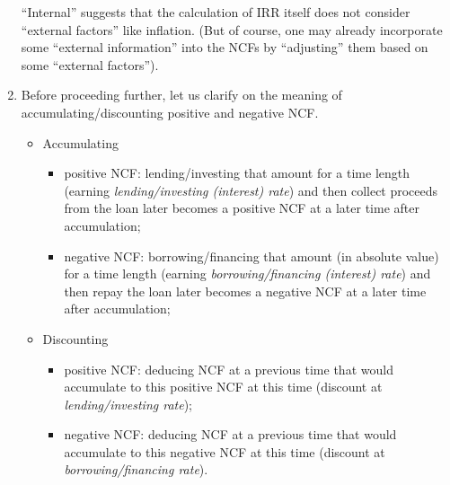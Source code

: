 \begin{enumerate}
\begin{note}
``Internal'' suggests that the calculation of IRR itself does not consider
``external factors'' like inflation. (But of course, one may already
incorporate some ``external information'' into the NCFs by ``adjusting'' them
based on some ``external factors'').
\end{note}
\item \label{it:acc-disc-ncf-meaning}
Before proceeding further, let us clarify on the meaning of
accumulating/discounting positive and negative NCF.
\begin{itemize}
\item Accumulating
\begin{itemize}
\item positive NCF: lending/investing that amount for a time length (earning
\emph{lending/investing (interest) rate}) and then collect proceeds from the
loan later  becomes a positive NCF at a later time after
accumulation;
\item negative NCF: borrowing/financing that amount (in absolute value) for a
time length (earning \emph{borrowing/financing (interest) rate}) and then repay
the loan later  becomes a negative NCF at a later time
after accumulation;
\end{itemize}
\item Discounting
\begin{itemize}
\item positive NCF: deducing NCF at a previous time that would accumulate to
this positive NCF at this time (discount at \emph{lending/investing rate});
\item negative NCF: deducing NCF at a previous time that would accumulate to
this negative NCF at this time (discount at \emph{borrowing/financing rate}).
\end{itemize}
\end{itemize}


\end{enumerate}
